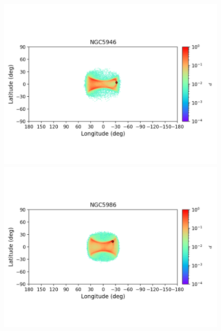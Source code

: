 \begin{figure}
\begin{center}
                \includegraphics[clip=true, trim = 0mm 20mm 0mm 10mm, width=1\columnwidth]{images/error_plots_NGC5946.png}
                \includegraphics[clip=true, trim = 0mm 20mm 0mm 10mm, width=1\columnwidth]{images/error_plots_NGC5986.png}
                

\end{center}
\end{figure}
